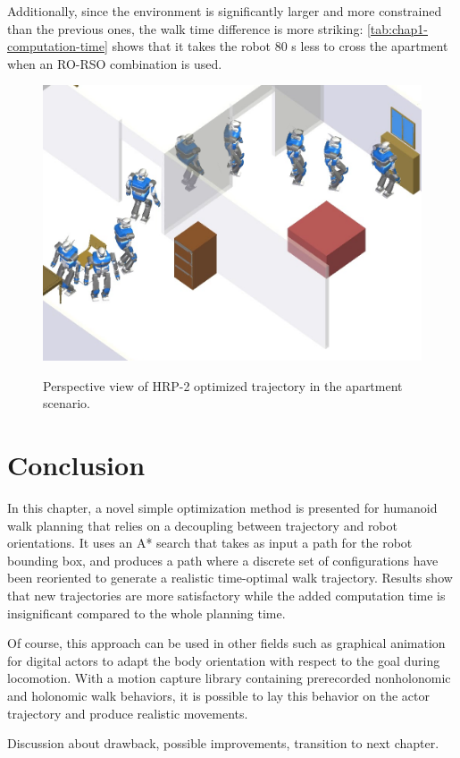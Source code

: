 Additionally, since the environment is significantly larger and more
constrained than the previous ones, the walk time difference is more
striking: \autoref{tab:chap1-computation-time} shows that it takes the robot
80 s less to cross the apartment when an RO-RSO combination is used.

\begin{figure}
  \centering
      {\includegraphics[width = \linewidth]
        {src/chap1-path-optimization/apartment-hash-optim-perspective-hrp2.png}}
      \caption{Perspective view of HRP-2 optimized trajectory in the
        apartment scenario.}
      \label{fig:chap1-apartment-hash-optim-perspective-hrp2}
\end{figure}

\section{Conclusion}
In this chapter, a novel simple optimization method is
presented for humanoid walk planning that relies on a decoupling
between trajectory and robot orientations. It uses an A* search that
takes as input a path for the robot bounding box, and produces a path
where a discrete set of configurations have been reoriented to generate
a realistic time-optimal walk trajectory. Results show that new
trajectories are more satisfactory while the added computation time is
insignificant compared to the whole planning time.

Of course, this approach can be used in other fields such as graphical
animation for digital actors to adapt the body orientation with respect
to the goal during locomotion. With a motion capture library
containing prerecorded nonholonomic and holonomic walk behaviors, it
is possible to lay this behavior on the actor trajectory and produce
realistic movements.

Discussion about drawback, possible improvements, transition to next
chapter.
